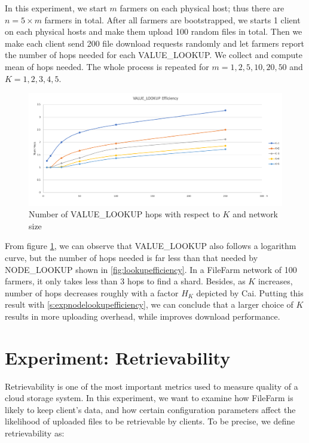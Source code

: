 In this experiment, we start $m$ farmers on each physical host; thus there are $n = 5 \times m$ farmers in total. After all farmers are bootstrapped, we starts 1 client on each physical hosts and make them upload 100 random files in total. Then we make each client send 200 file download requests randomly and let farmers report the number of hops needed for each VALUE\_LOOKUP. We collect and compute mean of hops needed. The whole process is repeated for $m=1,2,5,10,20,50$ and $K=1,2,3,4,5$.

\begin{figure}[hbt]
\centering
  \includegraphics[width=14cm]{charts/chart_value_lookup_efficiency.png}
  \caption{Number of VALUE\_LOOKUP hops with respect to $K$ and network size}
  \label{fig:valuelookupefficiency}
\end{figure}

\newpage

From figure \ref{fig:valuelookupefficiency}, we can observe that VALUE\_LOOKUP also follows a logarithm curve, but the number of hops needed is far less than that needed by NODE\_LOOKUP shown in \ref{fig:lookupefficiency}. In a FileFarm network of 100 farmers, it only takes less than 3 hops to find a shard. Besides, as $K$ increases, number of hops decreases roughly with a factor $H_{K}$ depicted by Cai\cite{cai2013probabilistic}. Putting this result with \ref{s:expnodelookupefficiency}, we can conclude that a larger choice of $K$ results in more uploading overhead, while improves download performance.

\section{Experiment: Retrievability}
\label{s:expretrievability}

Retrievability is one of the most important metrics used to measure quality of a cloud storage system. In this experiment, we want to examine how FileFarm is likely to keep client's data, and how certain configuration parameters affect the likelihood of uploaded files to be retrievable by clients. To be precise, we define retrievability as:

